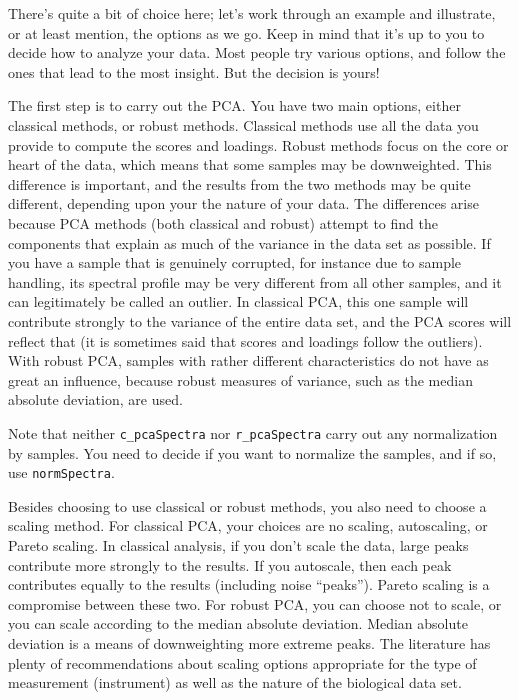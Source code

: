 \documentclass[letter,10pt,twocolumn,twoside,printwatermark=false]{pinp}
\begin{document}
There's quite a bit of choice here; let's work through an example and
illustrate, or at least mention, the options as we go. Keep in mind that
it's up to you to decide how to analyze your data. Most people try
various options, and follow the ones that lead to the most insight. But
the decision is yours!

The first step is to carry out the PCA. You have two main options,
either classical methods, or robust methods. Classical methods use all
the data you provide to compute the scores and loadings. Robust methods
focus on the core or heart of the data, which means that some samples
may be downweighted. This difference is important, and the results from
the two methods may be quite different, depending upon your the nature
of your data. The differences arise because PCA methods (both classical
and robust) attempt to find the components that explain as much of the
variance in the data set as possible. If you have a sample that is
genuinely corrupted, for instance due to sample handling, its spectral
profile may be very different from all other samples, and it can
legitimately be called an outlier. In classical PCA, this one sample
will contribute strongly to the variance of the entire data set, and the
PCA scores will reflect that (it is sometimes said that scores and
loadings follow the outliers). With robust PCA, samples with rather
different characteristics do not have as great an influence, because
robust measures of variance, such as the median absolute deviation, are
used.

Note that neither \texttt{c\_pcaSpectra} nor \texttt{r\_pcaSpectra}
carry out any normalization by samples. You need to decide if you want
to normalize the samples, and if so, use \texttt{normSpectra}.

Besides choosing to use classical or robust methods, you also need to
choose a scaling method. For classical PCA, your choices are no scaling,
autoscaling, or Pareto scaling. In classical analysis, if you don't
scale the data, large peaks contribute more strongly to the results. If
you autoscale, then each peak contributes equally to the results
(including noise ``peaks''). Pareto scaling is a compromise between
these two. For robust PCA, you can choose not to scale, or you can scale
according to the median absolute deviation. Median absolute deviation is
a means of downweighting more extreme peaks. The literature has plenty
of recommendations about scaling options appropriate for the type of
measurement (instrument) as well as the nature of the biological data
set.\citep{Raftery-Signal-Processing, Scale-Norm-Nicholson, NMR-Norm, Cent-Scale-Norm, Filz, Error-Struc-NMR}
\end{document}
